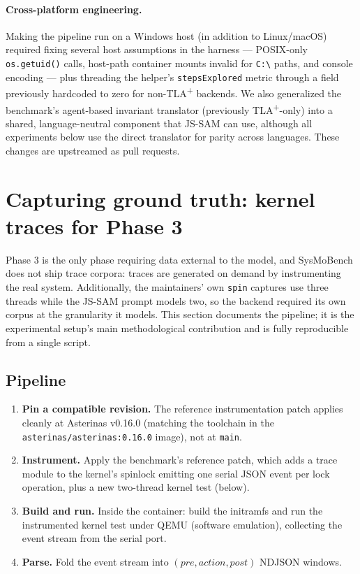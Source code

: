 \documentclass[11pt]{article}
\newcommand{\jssam}{JS-SAM}
\newcommand{\tlaplus}{TLA\texorpdfstring{\textsuperscript{+}}{+}}
\begin{document}
\paragraph{Cross-platform engineering.}
Making the pipeline run on a Windows host (in addition to Linux/macOS)
required fixing several host assumptions in the harness --- POSIX-only
\texttt{os.getuid()} calls, host-path container mounts invalid for
\texttt{C:\textbackslash} paths, and console encoding --- plus threading the
helper's \texttt{stepsExplored} metric through a field previously hardcoded to
zero for non-\tlaplus{} backends. We also generalized the benchmark's
agent-based invariant translator (previously \tlaplus{}-only) into a shared,
language-neutral component that \jssam{} can use, although all experiments
below use the direct translator for parity across languages. These changes
are upstreamed as pull requests.

\section{Capturing ground truth: kernel traces for Phase 3}
\label{sec:traces}

Phase 3 is the only phase requiring data external to the model, and SysMoBench
does not ship trace corpora: traces are generated on demand by instrumenting
the real system. Additionally, the maintainers' own \texttt{spin} captures use
three threads while the \jssam{} prompt models two, so the backend required
its own corpus at the granularity it models. This section documents the
pipeline; it is the experimental setup's main methodological contribution and
is fully reproducible from a single script.

\subsection{Pipeline}

\begin{enumerate}
\item \textbf{Pin a compatible revision.} The reference instrumentation patch
  applies cleanly at Asterinas v0.16.0 (matching the toolchain in the
  \texttt{asterinas/asterinas:0.16.0} image), not at \texttt{main}.
\item \textbf{Instrument.} Apply the benchmark's reference patch, which adds
  a trace module to the kernel's spinlock emitting one serial JSON event per
  lock operation, plus a new two-thread kernel test (below).
\item \textbf{Build and run.} Inside the container: build the initramfs and
  run the instrumented kernel test under QEMU (software emulation), collecting
  the event stream from the serial port.
\item \textbf{Parse.} Fold the event stream into
  $(\mathit{pre}, \mathit{action}, \mathit{post})$ NDJSON windows.
\end{enumerate}
\end{document}
